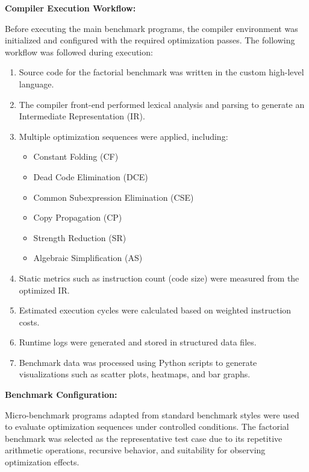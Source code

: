 \documentclass[conference]{IEEEtran}
\begin{document}
\textbf{Compiler Execution Workflow:}

Before executing the main benchmark programs, the compiler environment was initialized and configured with the required optimization passes. The following workflow was followed during execution:

\begin{enumerate}

\item Source code for the factorial benchmark was written in the custom high-level language.

\item The compiler front-end performed lexical analysis and parsing to generate an Intermediate Representation (IR).

\item Multiple optimization sequences were applied, including:
    \begin{itemize}
        \item Constant Folding (CF)
        \item Dead Code Elimination (DCE)
        \item Common Subexpression Elimination (CSE)
        \item Copy Propagation (CP)
        \item Strength Reduction (SR)
        \item Algebraic Simplification (AS)
    \end{itemize}

\item Static metrics such as instruction count (code size) were measured from the optimized IR.

\item Estimated execution cycles were calculated based on weighted instruction costs.

\item Runtime logs were generated and stored in structured data files.

\item Benchmark data was processed using Python scripts to generate visualizations such as scatter plots, heatmaps, and bar graphs.

\end{enumerate}

\textbf{Benchmark Configuration:}

Micro-benchmark programs adapted from standard benchmark styles were used to evaluate optimization sequences under controlled conditions. The factorial benchmark was selected as the representative test case due to its repetitive arithmetic operations, recursive behavior, and suitability for observing optimization effects.
\end{document}
